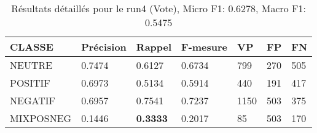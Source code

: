 \begin{table}
\begin{tabular}{l|l|l|l|l|l|l}
  CLASSE	&Précision	&Rappel	&F-mesure	&VP	&FP	&FN\\
\hline
  NEUTRE	&0.7474	&0.6127	&0.6734	&799	&270	&505\\
  POSITIF	&0.6973	&0.5134	&0.5914	&440	&191	&417\\
  NEGATIF	&0.6957	&0.7541	&0.7237	&1150	&503	&375\\
  MIXPOSNEG	&0.1446	&\textbf{0.3333}	&0.2017	&85	&503	&170\\
\hline
\end{tabular}
\caption{Résultats détaillés pour le run4 (Vote),
  Micro F1: 0.6278, Macro F1: 0.5475\label{tab:detail4}}
\end{table}
